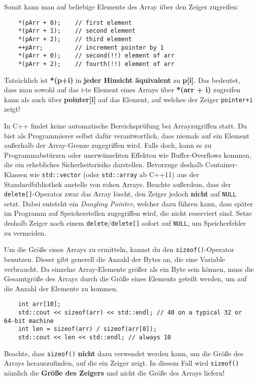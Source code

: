 Somit kann man auf beliebige Elemente des Array über den Zeiger zugreifen:

\begin{lstlisting}
	*(pArr + 0);	// first element
	*(pArr + 1);	// second element
	*(pArr + 2);	// third element
	++pArr;			// increment pointer by 1
	*(pArr + 0);	// second(!!) element of arr
	*(pArr + 2);	// fourth(!!) element of arr
\end{lstlisting}

Tatsächlich ist \textbf{*(p+i)} in \textbf{jeder Hinsicht äquivalent} zu \textbf{p[i]}.
Das bedeutet, dass man sowohl auf das i-te Element eines Arrays über \textbf{*(arr + i)} zugreifen kann als auch über \textbf{pointer[i]} auf das Element, auf welches der Zeiger \texttt{pointer+i} zeigt!

In C++ findet keine automatische Bereichsprüfung bei Arrayzugriffen statt.
Du bist als Programmierer selbst dafür verantwortlich, dass niemals auf ein Element außerhalb der Array-Grenze zugegriffen wird.
Falls doch, kann es zu Programmabstürzen oder unerwünschten Effekten wie  Buffer-Overflows kommen, die ein erhebliches Sicherheitsrisiko darstellen.
Bevorzuge deshalb Container-Klassen wie \texttt{std::vector} (oder \texttt{std::array} ab C++11) aus der Standardbibliothek anstelle von \glqq rohen\grqq{} Arrays.
Beachte außerdem, dass der \texttt{delete[]}-Operator zwar das Array löscht, den Zeiger jedoch \textbf{nicht} auf \texttt{NULL} setzt.
Dabei entsteht ein \emph{Dangling Pointer}, welcher dazu führen kann, dass später im Programm auf Speicherstellen zugegriffen wird, die nicht reserviert sind.
Setze deshalb Zeiger nach einem \texttt{delete}/\texttt{delete[]} sofort auf \texttt{NULL}, um Speicherfehler zu vermeiden.

Um die Größe eines Arrays zu ermitteln, kannst du den \texttt{sizeof()}-Operator benutzen.
Dieser gibt generell die Anzahl der Bytes an, die eine Variable verbraucht.
Da einzelne Array-Elemente größer als ein Byte sein können, muss die Gesamtgröße des Arrays durch die Größe eines Elements geteilt werden, um auf die Anzahl der Elemente zu kommen.

\begin{lstlisting}
	int arr[10];
	std::cout << sizeof(arr) << std::endl; // 40 on a typical 32 or 64-bit machine
	int len = sizeof(arr) / sizeof(arr[0]);
	std::cout << len << std::endl; // always 10
\end{lstlisting}

Beachte, dass \texttt{sizeof()} \textbf{nicht} dazu verwendet werden kann, um die Größe des Arrays herauszufinden, auf die ein Zeiger zeigt.
In diesem Fall wird \texttt{sizeof()} nämlich die \textbf{Größe des Zeigers} und nicht die Größe des Arrays liefern!

